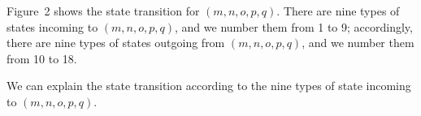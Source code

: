 \documentclass[conference]{IEEEtran}
\begin{document}
\begin{table*}[htbp]
\caption{feasible system state transition outgoing from $(m,n,o,p,q)$}
\begin{center}
\end{center}
\end{table*}
Figure~2 shows the state transition for $(m,n,o,p,q)$. There are nine types of states incoming to $(m,n,o,p,q)$, and we number them from 1 to 9; accordingly, there are nine types of states outgoing from $(m,n,o,p,q)$, and we number them from 10 to 18.

We can explain the state transition according to the nine types of state incoming to $(m,n,o,p,q)$.
\end{document}
